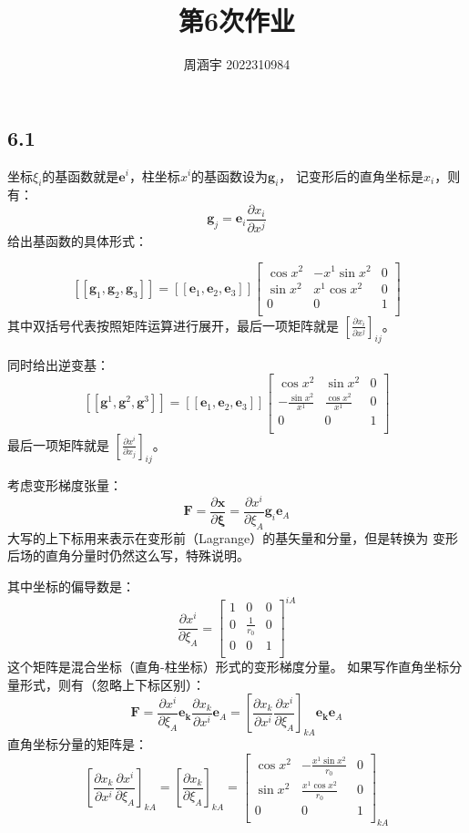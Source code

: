 \documentclass[UTF8,zihao=5]{ctexart}
\title{{\bfseries 第6次作业}}
\author{周涵宇 2022310984}
\date{}
\newcommand{\bm}[1]{{\mathbf{#1}}}
\newcommand*{\pd}[2]{\frac{\partial #1}{\partial #2}}
\begin{document}
\maketitle

\subsection*{6.1}

坐标$\xi_i$的基函数就是$\bm{e}^i$，柱坐标$x^i$的基函数设为$\bm{g}_i$，
记变形后的直角坐标是$x_i$，则有：
$$
    \bm{g}_j=\bm{e}_i\pd{x_i}{x^j}
$$
给出基函数的具体形式：

$$
    [[\bm{g}_1,\bm{g}_2,\bm{g}_3]]=[[\bm{e}_1,\bm{e}_2,\bm{e}_3]]
    \begin{bmatrix}
        \cos{x^2} & -x^1\sin{x^2} & 0 \\
        \sin{x^2} & x^1\cos{x^2}  & 0 \\
        0         & 0             & 1 \\
    \end{bmatrix}
$$
其中双括号代表按照矩阵运算进行展开，最后一项矩阵就是
$\left[\pd{x_i}{x^j}\right]_{ij}$。

同时给出逆变基：
$$
    [[\bm{g}^1,\bm{g}^2,\bm{g}^3]]=[[\bm{e}_1,\bm{e}_2,\bm{e}_3]]
    \begin{bmatrix}
        \cos{x^2}              & \sin{x^2}             & 0 \\
        -\frac{\sin{x^2}}{x^1} & \frac{\cos{x^2}}{x^1} & 0 \\
        0                      & 0                     & 1 \\
    \end{bmatrix}
$$
最后一项矩阵就是
$\left[\pd{x^i}{x_j}\right]_{ij}$。

考虑变形梯度张量：
$$
    \bm{F}=\pd{\bm{x}}{\bm{\xi}}
    =
    \pd{x^i}{\xi_A}\bm{g}_i\bm{e}_A
$$
大写的上下标用来表示在变形前（Lagrange）的基矢量和分量，但是转换为
变形后场的直角分量时仍然这么写，特殊说明。

其中坐标的偏导数是：
$$
    \pd{x^i}{\xi_A}=\begin{bmatrix}
        1 & 0             & 0 \\
        0 & \frac{1}{r_0} & 0 \\
        0 & 0             & 1 \\
    \end{bmatrix}^{iA}
$$
这个矩阵是混合坐标（直角-柱坐标）形式的变形梯度分量。
如果写作直角坐标分量形式，则有（忽略上下标区别）：
$$
    \bm{F}=\pd{x^i}{\xi_A}\bm{e_k}\pd{x_k}{x^i}\bm{e}_A
    =\left[
        \pd{x_k}{x^i}\pd{x^i}{\xi_A}
        \right]_{kA}\bm{e_k}\bm{e}_A
$$
直角坐标分量的矩阵是：
$$
    \left[
        \pd{x_k}{x^i}\pd{x^i}{\xi_A}
        \right]_{kA}=
    \left[
        \pd{x_k}{\xi_A}
        \right]_{kA}=\begin{bmatrix}
        \cos{x^2} & -\frac{x^1\sin{x^2}}{r_0} & 0 \\
        \sin{x^2} & \frac{x^1\cos{x^2}}{r_0}  & 0 \\
        0         & 0                         & 1 \\
    \end{bmatrix}_{kA}
$$
\end{document}

